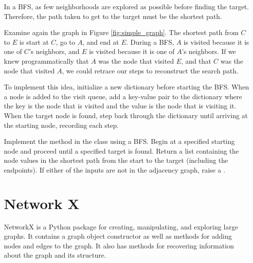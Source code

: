 In a BFS, as few neighborhoods are explored as possible before finding the target.
Therefore, the path taken to get to the target must be the shortest path.

Examine again the graph in Figure \ref{fig:simple_graph}.
The shortest path from $C$ to $E$ is start at $C$, go to $A$, and end at $E$.
During a BFS, $A$ is visited because it is one of $C$'s neighbors, and $E$ is visited because it is one of $A$'s neighbors.
If we knew programmatically that $A$ was the node that visited $E$, and that $C$ was the node that visited $A$, we could retrace our steps to reconstruct the search path.

To implement this idea, initialize a new dictionary before starting the BFS.
When a node is added to the visit queue, add a key-value pair to the dictionary where the key is the node that is visited and the value is the node that is visiting it.
When the target node is found, step back through the dictionary until arriving at the starting node, recording each step.

\begin{problem}
Implement the  method in the  class using a BFS.
Begin at a specified starting node and proceed until a specified target is found.
Return a list containing the node values in the shortest path from the start to the target (including the endpoints).
If either of the inputs are not in the adjacency graph, raise a .
\end{problem}

\section*{Network X}

NetworkX is a Python package for creating, manipulating, and exploring large graphs.
It contains a graph object constructor as well as methods for adding nodes and edges to the graph.
It also has methods for recovering information about the graph and its structure.

